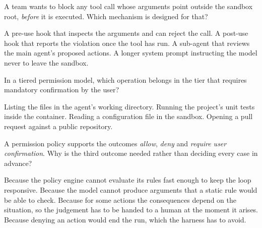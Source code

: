 \begin{questions}
\qitem A team wants to block any tool call whose arguments point outside the sandbox root, \emph{before}
it is executed. Which mechanism is designed for that?
\begin{choices}
  \CorrectChoice A pre-use hook that inspects the arguments and can reject the call.
  \choice A post-use hook that reports the violation once the tool has run.
  \choice A sub-agent that reviews the main agent's proposed actions.
  \choice A longer system prompt instructing the model never to leave the sandbox.
\end{choices}
\dontknow
{}

\qitem In a tiered permission model, which operation belongs in the tier that requires mandatory
confirmation by the user?
\begin{choices}
  \choice Listing the files in the agent's working directory.
  \choice Running the project's unit tests inside the container.
  \choice Reading a configuration file in the sandbox.
  \CorrectChoice Opening a pull request against a public repository.
\end{choices}
\dontknow
{}

\qitem A permission policy supports the outcomes \emph{allow}, \emph{deny} and \emph{require user
confirmation}. Why is the third outcome needed rather than deciding every case in advance?
\begin{choices}
  \choice Because the policy engine cannot evaluate its rules fast enough to keep the loop responsive.
  \choice Because the model cannot produce arguments that a static rule would be able to check.
  \CorrectChoice Because for some actions the consequences depend on the situation, so the judgement has to be handed to a human at the moment it arises.
  \choice Because denying an action would end the run, which the harness has to avoid.
\end{choices}
\dontknow
{}


\end{questions}
